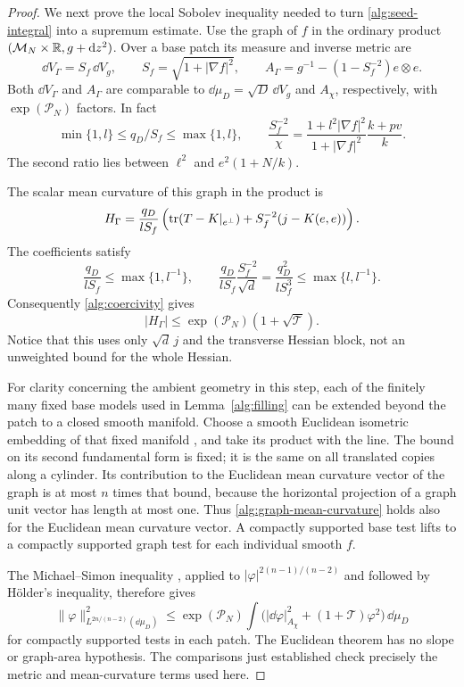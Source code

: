 \begin{proof}
We next prove the local Sobolev inequality needed to turn
\eqref{alg:seed-integral} into a supremum estimate.  Use the graph of
$f$ in the ordinary product $(\mathcal M_N\times\mathbb R,g+\mathrm d z^2)$.
Over a base patch its measure and inverse metric are
\[
 \dd V_\Gamma=S_f\,\dd V_g,\qquad
 S_f=\sqrt{1+|\nabla f|^2},\qquad
 A_\Gamma=g^{-1}-(1-S_f^{-2})e\otimes e.
\]
Both $\dd V_\Gamma$ and $A_\Gamma$ are comparable to
$\dd\mu_D=\sqrt D\,\dd V_g$ and $A_\chi$, respectively, with
$\exp(\mathcal P_N)$ factors.  In fact
\[
 \min\{1,l\}\leq q_D/S_f\leq\max\{1,l\},\qquad
 \frac{S_f^{-2}}\chi
 =\frac{1+l^2|\nabla f|^2}{1+|\nabla f|^2}\frac{k+pv}{k}.
\]
The second ratio lies between $\ell^2$ and $e^2(1+N/k)$.

The scalar mean curvature of this graph in the product is
\[
 H_\Gamma=\frac{q_D}{lS_f}
  \left(\operatorname{tr}(T-K|_{e^\perp})+S_f^{-2}(j-K(e,e))\right).
\]
The coefficients satisfy
\[
 \frac{q_D}{lS_f}\leq\max\{1,l^{-1}\},\qquad
 \frac{q_D}{lS_f}\frac{S_f^{-2}}{\sqrt d}
 =\frac{q_D^2}{lS_f^3}\leq\max\{l,l^{-1}\}.
\]
Consequently \eqref{alg:coercivity} gives
\begin{equation}
 |H_\Gamma|\leq\exp(\mathcal P_N)(1+\sqrt{\mathcal T}).
 \label{alg:graph-mean-curvature}
\end{equation}
Notice that this uses only $\sqrt d\,j$ and the transverse Hessian
block, not an unweighted bound for the whole Hessian.

For clarity concerning the ambient geometry in this step, each of the
finitely many fixed base models used in Lemma~\ref{alg:filling} can
be extended beyond the patch to a closed smooth manifold.  Choose a
smooth Euclidean isometric embedding of that fixed manifold
\cite{Nash1956}, and take its product with the line.  The bound on its
second fundamental form is fixed; it is the same on all translated
copies along a cylinder.  Its contribution to the Euclidean mean
curvature vector of the graph is at most $n$ times that bound, because
the horizontal projection of a graph unit vector has length at most
one.  Thus \eqref{alg:graph-mean-curvature} holds also for the Euclidean
mean curvature vector.  A compactly supported base test lifts to a
compactly supported graph test for each individual smooth $f$.

The Michael--Simon inequality \cite{MichaelSimon1973}, applied to
$|\varphi|^{2(n-1)/(n-2)}$ and followed by H\"older's inequality,
therefore gives
\begin{equation}
 \|\varphi\|_{L^{2n/(n-2)}(\dd\mu_D)}^2
 \leq\exp(\mathcal P_N)
 \int\bigl(|\dd\varphi|_{A_\chi}^2
                    +(1+\mathcal T)\varphi^2\bigr)\,\dd\mu_D
 \label{alg:graph-sobolev}
\end{equation}
for compactly supported tests in each patch.  The Euclidean theorem has
no slope or graph-area hypothesis.  The comparisons just established
check precisely the metric and mean-curvature terms used here.


\end{proof}
